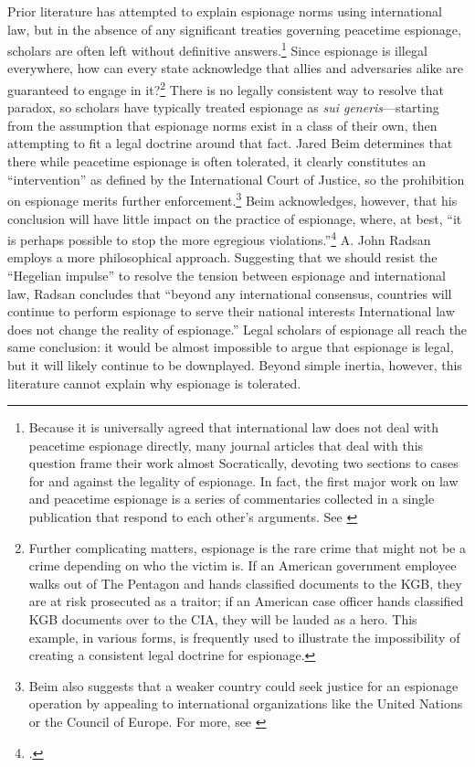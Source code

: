 \documentclass[14pt]{extarticle}
\begin{document}
Prior literature has attempted to explain espionage norms using international law, but in the absence of any significant treaties governing peacetime espionage, scholars are often left without definitive answers.\footnote{Because it is universally agreed that international law does not deal with peacetime espionage directly, many journal articles that deal with this question frame their work almost Socratically, devoting two sections to cases for and against the legality of espionage. In fact, the first major work on law and peacetime espionage is a series of commentaries collected in a single publication that respond to each other's arguments. See \cite{wright_essays_1962}} Since espionage is illegal everywhere, how can every state acknowledge that allies and adversaries alike are guaranteed to engage in it?\footnote{Further complicating matters, espionage is the rare crime that might not be a crime depending on who the victim is. If an American government employee walks out of The Pentagon and hands classified documents to the KGB, they are at risk prosecuted as a traitor; if an American case officer hands classified KGB documents over to the CIA, they will be lauded as a hero. This example, in various forms, is frequently used to illustrate the impossibility of creating a consistent legal doctrine for espionage.} There is no legally consistent way to resolve that paradox, so scholars have typically treated espionage as \emph{sui generis}---starting from the assumption that espionage norms exist in a class of their own, then attempting to fit a legal doctrine around that fact. Jared Beim determines that there while peacetime espionage is often tolerated, it clearly constitutes an \enquote{intervention} as defined by the International Court of Justice, so the prohibition on espionage merits further enforcement.\footnote{Beim also suggests that a weaker country could seek justice for an espionage operation by appealing to international organizations like the United Nations or the Council of Europe. For more, see \cite{beim_enforcing_2018}} Beim acknowledges, however, that his conclusion will have little impact on the practice of espionage, where, at best, \enquote{it is perhaps possible to stop the more egregious violations.}\footcite[p.~672]{beim_enforcing_2018} A. John Radsan employs a more philosophical approach. Suggesting that we should resist the \enquote{Hegelian impulse} to resolve the tension between espionage and international law, Radsan concludes that \enquote{beyond any international consensus, countries will continue to perform espionage to serve their national interests \textelp{} International law does not change the reality of espionage.} Legal scholars of espionage all reach the same conclusion: it would be almost impossible to argue that espionage is legal, but it will likely continue to be downplayed. Beyond simple inertia, however, this literature cannot explain why espionage is tolerated.
\end{document}
